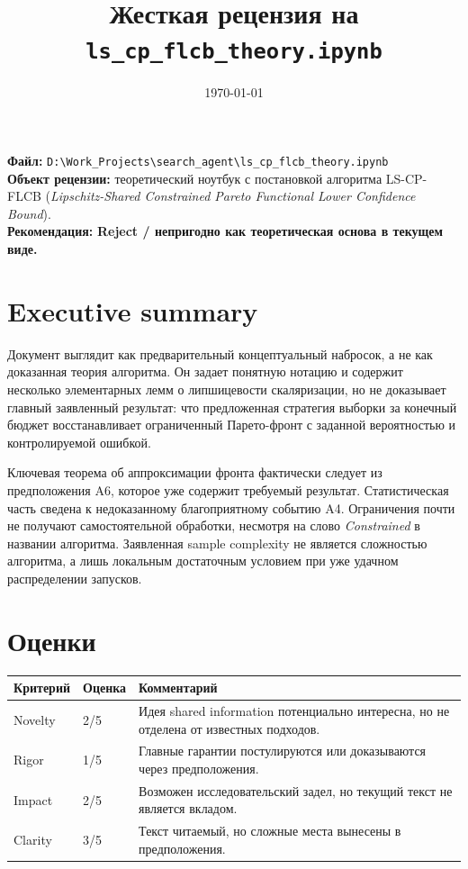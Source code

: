 \documentclass[11pt,a4paper]{article}
\title{Жесткая рецензия на \texttt{ls\_cp\_flcb\_theory.ipynb}}
\author{}
\date{\today}
\begin{document}
\maketitle

\noindent\textbf{Файл:} \texttt{D:\textbackslash Work\_Projects\textbackslash search\_agent\textbackslash ls\_cp\_flcb\_theory.ipynb}\\
\textbf{Объект рецензии:} теоретический ноутбук с постановкой алгоритма LS-CP-FLCB (\emph{Lipschitz-Shared Constrained Pareto Functional Lower Confidence Bound}).\\
\textbf{Рекомендация:} \textbf{Reject / непригодно как теоретическая основа в текущем виде.}

\section*{Executive summary}

Документ выглядит как предварительный концептуальный набросок, а не как доказанная теория алгоритма. Он задает понятную нотацию и содержит несколько элементарных лемм о липшицевости скаляризации, но не доказывает главный заявленный результат: что предложенная стратегия выборки за конечный бюджет восстанавливает ограниченный Парето-фронт с заданной вероятностью и контролируемой ошибкой.

Ключевая теорема об аппроксимации фронта фактически следует из предположения A6, которое уже содержит требуемый результат. Статистическая часть сведена к недоказанному благоприятному событию A4. Ограничения почти не получают самостоятельной обработки, несмотря на слово \emph{Constrained} в названии алгоритма. Заявленная sample complexity не является сложностью алгоритма, а лишь локальным достаточным условием при уже удачном распределении запусков.

\section*{Оценки}

\begin{center}
\begin{tabular}{|p{}|p{}|p{}|}
\hline
Критерий & Оценка & Комментарий \\
\hline
Novelty & 2/5 & Идея shared information потенциально интересна, но не отделена от известных подходов. \\
\hline
Rigor & 1/5 & Главные гарантии постулируются или доказываются через предположения. \\
\hline
Impact & 2/5 & Возможен исследовательский задел, но текущий текст не является вкладом. \\
\hline
Clarity & 3/5 & Текст читаемый, но сложные места вынесены в предположения. \\
\hline
\end{tabular}
\end{center}
\end{document}
